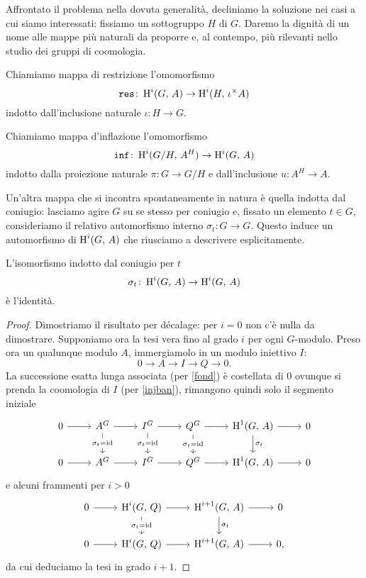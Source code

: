 Affrontato il problema nella dovuta generalità, decliniamo la soluzione nei casi a cui siamo interessati: fissiamo un sottogruppo $ H $ di $ G $. Daremo la dignità di un nome alle mappe più naturali da proporre e, al contempo, più rilevanti nello studio dei gruppi di coomologia.
\begin{definition}[Restrizione]
	Chiamiamo mappa di restrizione l'omomorfismo
	\[ \operatorname{\mathtt{res}} \colon \operatorname{H}^i(G, \, A) \to \operatorname{H}^i(H, \, \iota^\times A) \]
	indotto dall'inclusione naturale $ \iota \colon H \to G $.
\end{definition}

\begin{definition}[Inflazione]
	Chiamiamo mappa d'inflazione l'omomorfismo
	\[ \operatorname{\mathtt{inf}} \colon \operatorname{H}^i(G/H, \, A^H) \to \operatorname{H}^i(G, \, A) \]
	indotto dalla proiezione naturale $ \pi \colon G \to G/H $ e dall'inclusione $ u \colon A^H \to A $.
\end{definition}

Un'altra mappa che si incontra spontaneamente in natura è quella indotta dal coniugio: lasciamo agire $ G $ su se stesso per coniugio e, fissato un elemento $ t \in G $, consideriamo il relativo automorfismo interno $ \sigma_t \colon G \to G $. Questo induce un automorfismo di $ \operatorname{H}^i(G, \, A) $ che riusciamo a descrivere esplicitamente.

\begin{proposition}\label{coniugio}
	L'isomorfismo indotto dal coniugio per $ t $
	\[ \sigma_t \colon \operatorname{H}^i(G, \, A) \to \operatorname{H}^i(G, \, A) \]
	è l'identità.
\end{proposition}
\begin{proof}
	Dimostriamo il risultato per décalage: per $ i = 0 $ non c'è nulla da dimostrare. Supponiamo ora la tesi vera fino al grado $ i $ per ogni $ G $-modulo. Preso ora un qualunque modulo $ A $, immergiamolo in un modulo iniettivo $ I $:
	\[ 0 \to A \to I \to Q \to 0. \]
	La successione esatta lunga associata (per \ref{fond}) è costellata di $ 0 $ ovunque si prenda la coomologia di $ I $ (per \ref{injban}), rimangono quindi solo il segmento iniziale
	\[\begin{tikzcd}
	0 \rar & A^G \rar\dar["\sigma_t = \id" description] & I^G \rar\dar["\sigma_t = \id" description] & Q^G \rar\dar["\sigma_t = \id" description] & \HH^1(G, \, A) \rar\dar["\sigma_t"] & 0 \\
	0 \rar & A^G \rar & I^G \rar & Q^G \rar & \HH^1(G, \, A) \rar & 0
	\end{tikzcd}\]
	e alcuni frammenti per $ i > 0 $
	\[\begin{tikzcd}
	0 \rar & \HH^i(G, \, Q) \rar\dar["\sigma_t = \id" description] & \HH^{i+1}(G, \, A) \rar\dar["\sigma_t"] & 0 \\
	0 \rar & \HH^i(G, \, Q) \rar & \HH^{i+1}(G, \, A) \rar & 0,
	\end{tikzcd}\]
	da cui deduciamo la tesi in grado $ i+1 $.
\end{proof}

